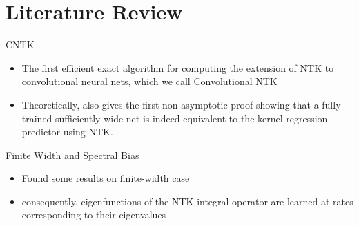 \documentclass[serif, aspectratio=169]{beamer}
\begin{document}
 
 
 
 
\section{Literature Review}

\begin{frame}{CNTK}
\begin{itemize}
	\item The first efficient exact algorithm for computing the extension of NTK to convolutional neural nets, which we call Convolutional NTK
	\item Theoretically, also
	gives the first non-asymptotic proof showing that a fully-trained sufficiently wide net is indeed equivalent to the kernel regression predictor using NTK.
\end{itemize}
\end{frame}

%	
%


%
%	
%	


\begin{frame}{Finite Width and Spectral Bias}
	\begin{itemize}
		
		\item Found some results on finite-width case

	\item consequently, eigenfunctions of the NTK integral operator are learned at rates corresponding to their eigenvalues
	 
	
	\end{itemize}
\end{frame}
\end{document}
